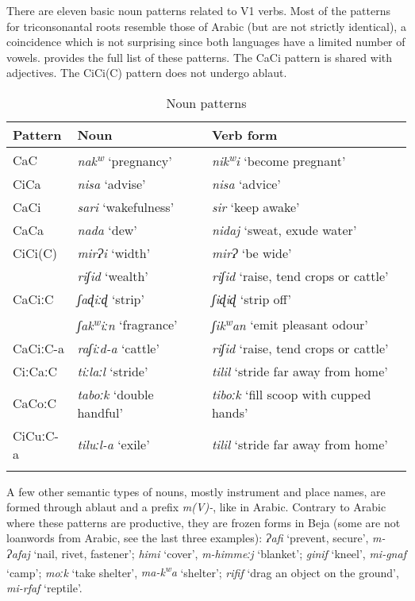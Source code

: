\documentclass[output=paper]{langsci/langscibook}
\begin{document}
There are eleven basic noun patterns related to V1 verbs. Most of the patterns for triconsonantal roots resemble those of Arabic (but are not strictly identical), a coincidence which is not surprising since both languages have a limited number of vowels.  provides the full list of these patterns. The CaCi pattern is shared with adjectives. The CiCi(C) pattern does not undergo ablaut.

\begin{table}
\begin{tabularx}{.95\textwidth}{llX}
\lsptoprule
Pattern & Noun & Verb form\\
\midrule
CaC & \textit{nak\textsuperscript{w}} ‘pregnancy’ & \textit{nik\textsuperscript{w}}\textit{i} ‘become pregnant’\\
CiCa & \textit{nisa} ‘advise’ & \textit{nisa} ‘advice’\\
CaCi & \textit{sari} ‘wakefulness’ & \textit{sir} ‘keep awake’\\
CaCa & \textit{nada} ‘dew’ & \textit{nidaj} ‘sweat, exude water’\\
CiCi(C) & \textit{mirɁi} ‘width’ & \textit{mirɁ} ‘be wide’\\
& \textit{riʃid} ‘wealth’ & \textit{riʃid} ‘raise, tend crops or cattle’\\
CaCiːC & \textit{ʃaɖiːɖ} ‘strip’ & \textit{ʃiɖiɖ} ‘strip off’\\
& \textit{ʃak\textsuperscript{w}}\textit{iːn} ‘fragrance’ & \textit{ʃik\textsuperscript{w}}\textit{an} ‘emit pleasant odour’\\
CaCiːC-a & \textit{raʃiːd-a} ‘cattle’ & \textit{riʃid} ‘raise, tend crops or cattle’\\
CiːCaːC & \textit{tiːlaːl} ‘stride’ & \textit{tilil} ‘stride far away from home’\\
CaCoːC & \textit{taboːk} ‘double handful’ & \textit{tiboːk} ‘fill scoop with cupped hands’\\
CiCuːC-a & \textit{tiluːl-a} ‘exile’ & \textit{tilil} ‘stride far away from home’\\
\lspbottomrule
\end{tabularx} 
\caption{Noun patterns}
\label{tab:vanhove:nounpat}
\end{table}


 
 
 




A few other semantic types of nouns, mostly instrument and place names, are formed through ablaut and a prefix \textit{m(V)-}, like in Arabic. Contrary to Arabic where these patterns are productive, they are frozen forms in Beja (some are not loanwords from Arabic, see the last three examples): \textit{Ɂafi} ‘prevent, secure’, \textit{m\nobreakdash-Ɂafaj} ‘nail, rivet, fastener’; \textit{himi} ‘cover’, \textit{m-himmeːj} ‘blanket’; \textit{ginif} ‘kneel’, \textit{mi-gnaf} ‘camp’; \textit{moːk} ‘take shelter’, \textit{ma\nobreakdash-k\textsuperscript{w}}\textit{a} ‘shelter’; \textit{rifif} ‘drag an object on the ground’, \textit{mi-rfaf} ‘reptile’.
\end{document}
